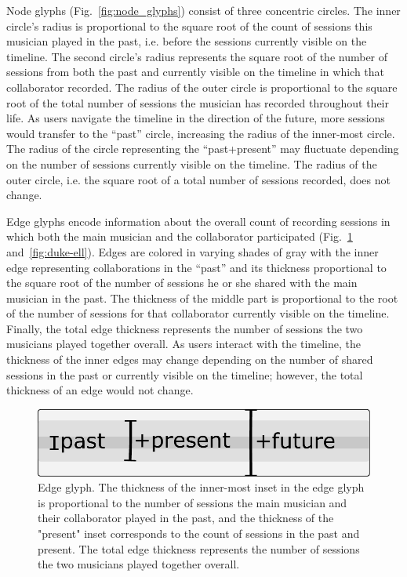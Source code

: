 \documentclass[12pt]{cmuthesis}
\begin{document}
  Node glyphs (Fig.~\ref{fig:node_glyphs}) consist of three concentric circles.
  The inner circle's radius is proportional to the square root of the count of
  sessions this musician played in the past, i.e. before the sessions currently
  visible on the timeline. The second circle's radius represents the square root
  of  the number of sessions from both the past and currently visible on the
  timeline in which that collaborator recorded. The radius of the outer circle is
  proportional to the square root of the total number of sessions the musician has
  recorded throughout their life. As users navigate the timeline in the direction
  of the future, more sessions would transfer to the ``past'' circle, increasing
  the radius of the inner-most circle. The radius of the circle representing the
  ``past+present'' may fluctuate depending on the number of sessions currently
  visible on the timeline. The radius of the outer circle, i.e. the square root of
  a total number of sessions recorded, does not change.

  Edge glyphs encode information about the overall count of recording sessions in
  which both the main musician and the collaborator participated
  (Fig.~\ref{fig:edge_glyphs} and~\ref{fig:duke-ell}). Edges are colored in varying shades of gray with
  the inner edge representing collaborations in the ``past'' and its thickness
  proportional to the square root of the number of sessions he or she shared with
  the main musician in the past. The thickness of the middle part is proportional
  to the root of the number of sessions for that collaborator currently visible on
  the timeline. Finally, the total edge thickness represents the number of
  sessions the two musicians played together overall.
   As users interact with the timeline, the thickness of the
  inner edges may change depending on the number of shared sessions in the past or
  currently visible on the timeline; however, the total thickness of an edge would
  not change.

  \begin{figure}[ht]
    \centering
    \includegraphics[width=0.7\linewidth]{edge-glyph}
    \caption{Edge glyph. The thickness of the inner-most inset in the edge glyph
  is proportional to the number of sessions the main musician and their
  collaborator played in the past, and the thickness of the "present" inset
  corresponds to the count of sessions in the past and present. The total edge
  thickness represents the number of sessions the two musicians played together
  overall.}
    \label{fig:edge_glyphs}
  \end{figure}
\end{document}

